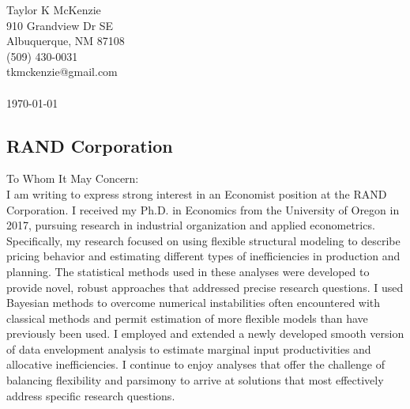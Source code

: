\documentclass[]{article}
\begin{document}
\thispagestyle{empty}

\noindent Taylor K McKenzie\\ 910 Grandview Dr SE\\ Albuquerque, NM 87108\\ (509) 430-0031\\ tkmckenzie@gmail.com\\ \\
\today

\subsection*{RAND Corporation}

To Whom It May Concern: \\

I am writing to express strong interest in an Economist position at the RAND Corporation. I received my Ph.D. in Economics from the University of Oregon in 2017, pursuing research in industrial organization and applied econometrics. Specifically, my research focused on using flexible structural modeling to describe pricing behavior and estimating different types of inefficiencies in production and planning. The statistical methods used in these analyses were developed to provide novel, robust approaches that addressed precise research questions. I used Bayesian methods to overcome numerical instabilities often encountered with classical methods and permit estimation of more flexible models than have previously been used. I employed and extended a newly developed smooth version of data envelopment analysis to estimate marginal input productivities and allocative inefficiencies. I continue to enjoy analyses that offer the challenge of balancing flexibility and parsimony to arrive at solutions that most effectively address specific research questions.\\
\end{document}
